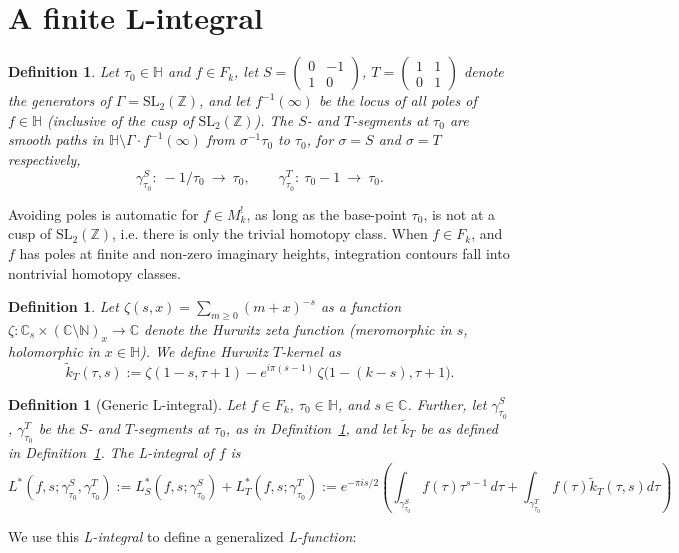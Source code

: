 \documentclass[11pt]{article}
\newtheorem{definition}[theorem]{Definition}
\newcommand{\HH}{\mathbb{H}}
\newcommand{\ZZ}{\mathbb{Z}}
\newcommand{\CC}{\mathbb{C}}
\newcommand{\NN}{\mathbb{N}}
\newcommand{\SLZ}{\mathrm{SL}_2(\ZZ)}
\newcommand{\tk}{\widetilde{k}_T}
\begin{document}
\section{A finite L-integral}\label{sec:Lint}


\begin{definition}\label{def:segments}
Let $\tau_0\in\HH$ and $f\in F_k$, let
$S=\left(\begin{smallmatrix}0&-1\\1&0\end{smallmatrix}\right)$,
$T=\left(\begin{smallmatrix}1&1\\0&1\end{smallmatrix}\right)$ denote 
the generators of $\Gamma=\SLZ$, and let $f^{-1}(\infty)$ be the locus 
of all poles of $f \in \HH$ (inclusive of the cusp of $\SLZ$).  
The \emph{$S$- and $T$-segments at $\tau_0$} are smooth paths in
$\HH\setminus\Gamma\!\cdot\!f^{-1}(\infty)$ from $\sigma^{-1}\tau_0$ to $\tau_0$, for
$\sigma=S$ and $\sigma=T$ respectively,
\begin{equation}
\gamma^S_{\tau_0}:\ -1/\tau_0\ \longrightarrow\ \tau_0,\qquad
\gamma^T_{\tau_0}:\ \tau_0-1\ \longrightarrow\ \tau_0.
\end{equation}
\end{definition}

Avoiding poles is automatic for $f \in M_k^!$, as long as the base-point $\tau_0$, 
is not at a cusp of $\SLZ$, i.e. there is only the trivial homotopy class. 
When $f \in F_k$, and $f$ has poles at finite and non-zero imaginary heights, 
integration contours fall into nontrivial homotopy classes.

\begin{definition}\label{def:kernel}
Let $\zeta(s,x)=\sum_{m\ge0}(m+x)^{-s}$ as a function 
$\zeta: \CC_s \times (\CC\setminus\NN)_x \to \CC$ denote the 
Hurwitz zeta function (meromorphic in $s$, holomorphic in $x\in\HH$). 
We define \emph{Hurwitz $T$-kernel} as
\begin{equation}
\tk(\tau,s):=\zeta(1-s,\tau+1)-e^{i\pi(s-1)}\,\zeta\big(1-(k-s),\tau+1\big).
\end{equation}
\end{definition}

\begin{definition}[Generic L-integral]
\label{def:Lint}
Let $f\in F_k$, $\tau_0\in\HH$, and $s\in\CC$. Further, let $\gamma^S_{\tau_0}$,
$\gamma^T_{\tau_0}$ be the $S$- and $T$-segments at $\tau_0$, as in
Definition~\ref{def:segments}, and let $\tk$ be as defined in 
Definition~\ref{def:kernel}. The \emph{L-integral} of $f$ is
\begin{equation}
L^*(f,s;\gamma^S_{\tau_0},\gamma^T_{\tau_0})
:= L^*_S(f,s; \gamma^S_{\tau_0}) + L^*_T(f,s; \gamma^T_{\tau_0})
:=e^{-\pi i s/2}\left(\int_{\gamma^S_{\tau_0}}\!\!\!\! f(\tau)\tau^{s-1}\,d\tau
+\int_{\gamma^T_{\tau_0}}\!\!\!\! f(\tau)\tk(\tau,s)d\tau\right)
\end{equation}
\end{definition}
We use this \emph{L-integral} to define a generalized 
\emph{L-function}:
\end{document}
